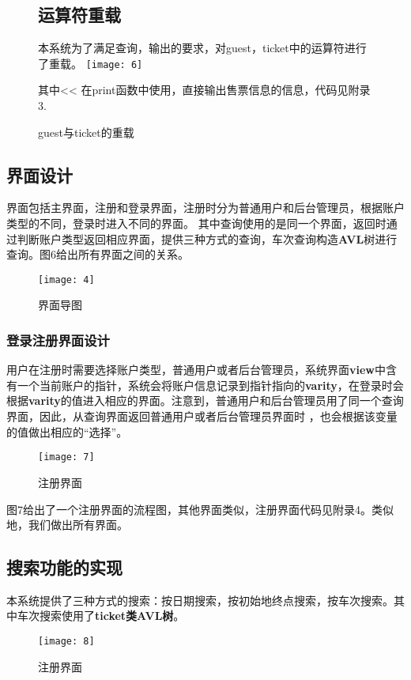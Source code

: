 \documentclass{apmcmthesis}
\begin{document}
	\begin{figure}[]
		
		\subsection{运算符重载}
		本系统为了满足查询，输出的要求，对guest，ticket中的运算符进行了重载。
		\texttt{[image: 6]}
		\caption{guest与ticket的重载}
		其中<< 在print函数中使用，直接输出售票信息的信息，代码见附录3.
	\end{figure}
	







\subsection{界面设计}
界面包括主界面，注册和登录界面，注册时分为普通用户和后台管理员，根据账户类型的不同，登录时进入不同的界面。
其中查询使用的是同一个界面，返回时通过判断账户类型返回相应界面，提供三种方式的查询，车次查询构造\textbf{AVL}树进行查询。图6给出所有界面之间的关系。


\begin{figure}[H]
	\texttt{[image: 4]}
	\caption{界面导图}
\end{figure}

 \subsubsection{登录注册界面设计}
 用户在注册时需要选择账户类型，普通用户或者后台管理员，系统界面\textbf{view}中含有一个当前账户的指针，系统会将账户信息记录到指针指向的\textbf{varity}，在登录时会根据\textbf{varity}的值进入相应的界面。注意到，普通用户和后台管理员用了同一个查询界面，因此，从查询界面返回普通用户或者后台管理员界面时 ，也会根据该变量的值做出相应的“选择”。
 
 \begin{figure}[H]
 	\texttt{[image: 7]}
 	\caption{注册界面}
 \end{figure}
 
 图7给出了一个注册界面的流程图，其他界面类似，注册界面代码见附录4。类似地，我们做出所有界面。

\subsection{搜索功能的实现}
本系统提供了三种方式的搜索：按日期搜索，按初始地终点搜索，按车次搜索。其中车次搜索使用了\textbf{ticket类AVL树}。
\begin{figure}[H]
	\texttt{[image: 8]}
	\caption{注册界面}
\end{figure}
\end{document}

